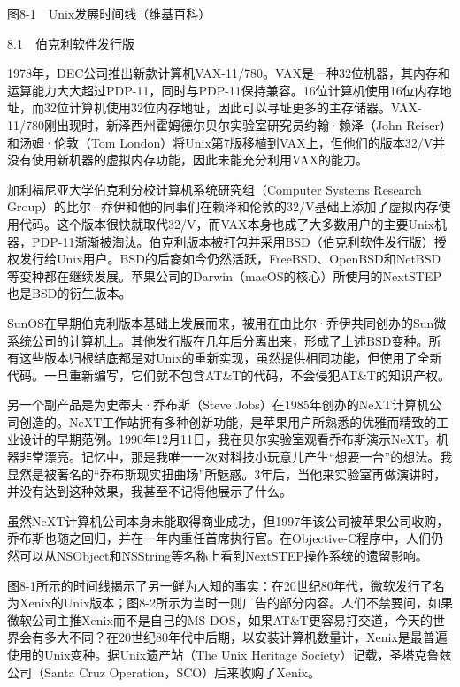 \documentclass[a4paper,12pt,UTF8,twoside]{ctexbook}
\begin{document}
图8-1　Unix发展时间线（维基百科）





8.1　伯克利软件发行版


1978年，DEC公司推出新款计算机VAX-11/780。VAX是一种32位机器，其内存和运算能力大大超过PDP-11，同时与PDP-11保持兼容。16位计算机使用16位内存地址，而32位计算机使用32位内存地址，因此可以寻址更多的主存储器。VAX-11/780刚出现时，新泽西州霍姆德尔贝尔实验室研究员约翰·赖泽（John Reiser）和汤姆·伦敦（Tom London）将Unix第7版移植到VAX上，但他们的版本32/V并没有使用新机器的虚拟内存功能，因此未能充分利用VAX的能力。

加利福尼亚大学伯克利分校计算机系统研究组（Computer Systems Research Group）的比尔·乔伊和他的同事们在赖泽和伦敦的32/V基础上添加了虚拟内存使用代码。这个版本很快就取代32/V，而VAX本身也成了大多数用户的主要Unix机器，PDP-11渐渐被淘汰。伯克利版本被打包并采用BSD（伯克利软件发行版）授权发行给Unix用户。BSD的后裔如今仍然活跃，FreeBSD、OpenBSD和NetBSD等变种都在继续发展。苹果公司的Darwin（macOS的核心）所使用的NextSTEP也是BSD的衍生版本。

SunOS在早期伯克利版本基础上发展而来，被用在由比尔·乔伊共同创办的Sun微系统公司的计算机上。其他发行版在几年后分离出来，形成了上述BSD变种。所有这些版本归根结底都是对Unix的重新实现，虽然提供相同功能，但使用了全新代码。一旦重新编写，它们就不包含AT\&T的代码，不会侵犯AT\&T的知识产权。

另一个副产品是为史蒂夫·乔布斯（Steve Jobs）在1985年创办的NeXT计算机公司创造的。NeXT工作站拥有多种创新功能，是苹果用户所熟悉的优雅而精致的工业设计的早期范例。1990年12月11日，我在贝尔实验室观看乔布斯演示NeXT。机器非常漂亮。记忆中，那是我唯一一次对科技小玩意儿产生“想要一台”的想法。我显然是被著名的“乔布斯现实扭曲场”所魅惑。3年后，当他来实验室再做演讲时，并没有达到这种效果，我甚至不记得他展示了什么。

虽然NeXT计算机公司本身未能取得商业成功，但1997年该公司被苹果公司收购，乔布斯也随之回归，并在一年内重任首席执行官。在Objective-C程序中，人们仍然可以从NSObject和NSString等名称上看到NextSTEP操作系统的遗留影响。

图8-1所示的时间线揭示了另一鲜为人知的事实：在20世纪80年代，微软发行了名为Xenix的Unix版本；图8-2所示为当时一则广告的部分内容。人们不禁要问，如果微软公司主推Xenix而不是自己的MS-DOS，如果AT\&T更容易打交道，今天的世界会有多大不同？在20世纪80年代中后期，以安装计算机数量计，Xenix是最普遍使用的Unix变种。据Unix遗产站（The Unix Heritage Society）记载，圣塔克鲁兹公司（Santa Cruz Operation，SCO）后来收购了Xenix。
\end{document}
